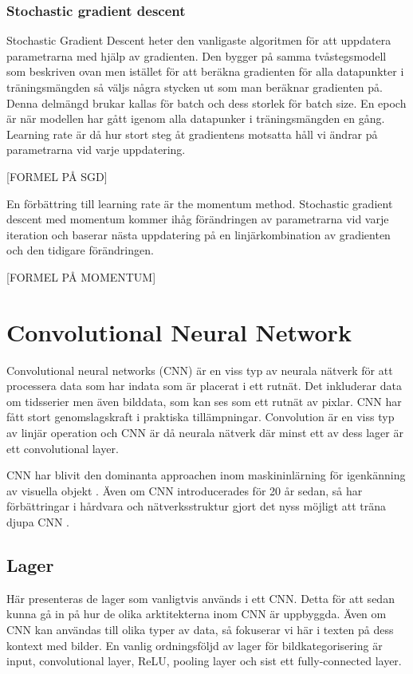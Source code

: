 \documentclass[]{kththesis}
\begin{document}
\subsubsection{Stochastic gradient descent}
Stochastic Gradient Descent heter den vanligaste algoritmen för att uppdatera parametrarna med hjälp av gradienten. Den bygger på samma tvåstegsmodell som beskriven ovan men istället för att beräkna gradienten för alla datapunkter i träningsmängden så väljs några stycken ut som man beräknar gradienten på. Denna delmängd brukar kallas för batch och dess storlek för batch size. En epoch är när modellen har gått igenom alla datapunker i träningsmängden en gång. Learning rate är då hur stort steg åt gradientens motsatta håll vi ändrar på parametrarna vid varje uppdatering.

[FORMEL PÅ SGD]

En förbättring till learning rate är the momentum method. Stochastic gradient descent med momentum kommer ihåg förändringen av parametrarna vid varje iteration och baserar nästa uppdatering på en linjärkombination av gradienten och den tidigare förändringen. 

[FORMEL PÅ MOMENTUM]

\section{Convolutional Neural Network}
Convolutional neural networks (CNN) är en viss typ av neurala nätverk för att processera data som har indata som är placerat i ett rutnät. Det inkluderar data om tidsserier men även bilddata, som kan ses som ett rutnät av pixlar. CNN har fått stort genomslagskraft i praktiska tillämpningar. Convolution är en viss typ av linjär operation och CNN är då neurala nätverk där minst ett av dess lager är ett convolutional layer.

CNN har blivit den dominanta approachen inom maskininlärning för igenkänning av visuella objekt \parencite{huang2017densely}. Även om CNN introducerades för 20 år sedan, så har förbättringar i hårdvara och nätverksstruktur gjort det nyss möjligt att träna djupa CNN \parencite{huang2017densely}.



\subsection{Lager}
Här presenteras de lager som vanligtvis används i ett CNN. Detta för att sedan kunna gå in på hur de olika arktitekterna inom CNN är uppbyggda. Även om CNN kan användas till olika typer av data, så fokuserar vi här i texten på dess kontext med bilder. En vanlig ordningsföljd av lager för bildkategorisering är input, convolutional layer, ReLU, pooling layer och sist ett fully-connected layer.
\end{document}
